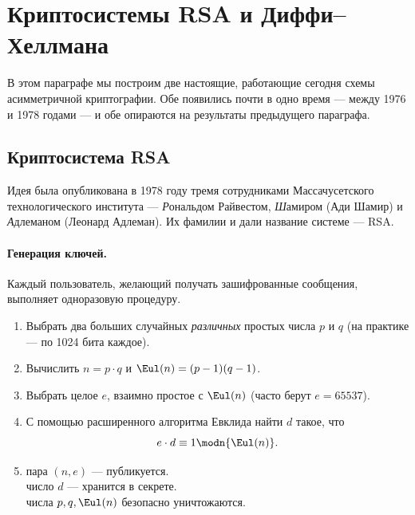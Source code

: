 
\section{Криптосистемы RSA и Диффи--Хеллмана}
\label{sec:rsa-dh}

В этом параграфе мы построим две настоящие, работающие сегодня схемы асимметричной криптографии. Обе появились почти в одно время --- между 1976 и 1978 годами --- и обе опираются на результаты предыдущего параграфа.

\subsection{Криптосистема RSA}

Идея была опубликована в 1978 году тремя сотрудниками Массачусетского технологического института --- \emph{Р}ональдом Райвестом, \emph{Ш}амиром (Ади Шамир) и \emph{А}длеманом (Леонард Адлеман). Их фамилии и дали название системе --- RSA.

\paragraph*{Генерация ключей.} Каждый пользователь, желающий получать зашифрованные сообщения, выполняет одноразовую процедуру.

\begin{algorithmbox}[title={Алгоритм: генерация ключей RSA}]
\begin{enumerate}
  \item Выбрать два больших случайных \emph{различных} простых числа $p$ и $q$ (на практике --- по 1024 бита каждое).
  \item Вычислить $n = p\cdot q$ и $\Eul(n) = (p-1)(q-1)$.
  \item Выбрать целое $e$, взаимно простое с $\Eul(n)$ (часто берут $e = 65537$).
  \item С помощью расширенного алгоритма Евклида найти $d$ такое, что
  \[
  e\cdot d \equiv 1 \modn{\Eul(n)}.
  \]
  \item {} пара $(n, e)$ --- публикуется.\\
         число $d$ --- хранится в секрете.\\
         числа $p, q, \Eul(n)$ безопасно уничтожаются.
\end{enumerate}
\end{algorithmbox}

